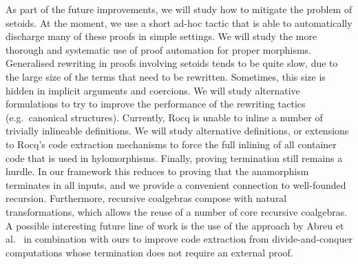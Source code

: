 \documentclass[a4paper,UKenglish,cleveref, autoref, thm-restate]{lipics-v2021}
\begin{document}
As part of the future improvements, we will study how to mitigate the problem of
setoids. At the moment, we use a short ad-hoc tactic that is able to
automatically discharge many of these proofs in simple settings.  We will study
the more thorough and systematic use of proof automation for proper morphisms.
Generalised rewriting in proofs involving setoids tends to be quite slow, due to
the large size of the terms that need to be rewritten. Sometimes, this size is
hidden in implicit arguments and coercions. We will study alternative
formulations to try to improve the performance of the rewriting tactics
(e.g.\ canonical structures).  Currently, Rocq is unable to inline a number of
trivially inlineable definitions.  We will study alternative definitions, or
extensions to Rocq's code extraction mechanisms to force the full inlining of all
container code that is used in hylomorphisms.  Finally, proving termination
still remains a hurdle. In our framework this reduces to proving that the
anamorphism terminates in all inputs, and we provide a convenient connection to
well-founded recursion. Furthermore, recursive coalgebras compose with natural
transformations, which allows the reuse of a number of core recursive
coalgebras. A possible interesting future line of work is the use of the
approach by Abreu et al.~\cite{AbreuDHJMS23} in combination with ours to improve
code extraction from divide-and-conquer computations whose termination does not
require an external proof.


\newpage


\end{document}
